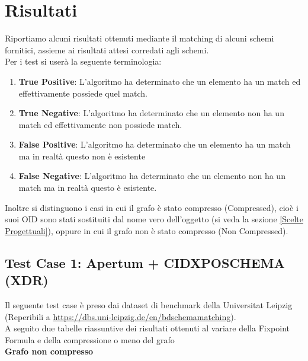 \documentclass{article}
\begin{document}

\section{Risultati}

Riportiamo alcuni risultati ottenuti mediante il matching di alcuni schemi fornitici, assieme ai risultati attesi corredati agli schemi.\\

Per i test si userà la seguente terminologia:
\begin{enumerate}
	\item \textbf{True Positive}: L'algoritmo ha determinato che un elemento ha un match ed effettivamente possiede quel match.
	\item \textbf{True Negative}: L'algoritmo ha determinato che un elemento non ha un match ed effettivamente non possiede match.
	\item \textbf{False Positive}: L'algoritmo ha determinato che un elemento ha un match ma in realtà questo non è esistente
	\item \textbf{False Negative}: L'algoritmo ha determinato che un elemento non ha un match ma in realtà questo è esistente.
\end{enumerate}

Inoltre si distinguono i casi in cui il grafo è stato compresso (Compressed), cioè i suoi OID sono stati sostituiti dal nome vero dell'oggetto (si veda la sezione \ref{Scelte Progettuali}), oppure in cui il grafo non è stato compresso (Non Compressed).

\subsection{Test Case 1: Apertum + CIDXPOSCHEMA (XDR)}

Il seguente test case è preso dai dataset di benchmark della Universitat Leipzig (Reperibili a \url{https://dbs.uni-leipzig.de/en/bdschemamatching}).\\

A seguito due tabelle riassuntive dei risultati ottenuti al variare della Fixpoint Formula e della compressione o meno del grafo\\

\textbf{Grafo non compresso}
\end{document}

